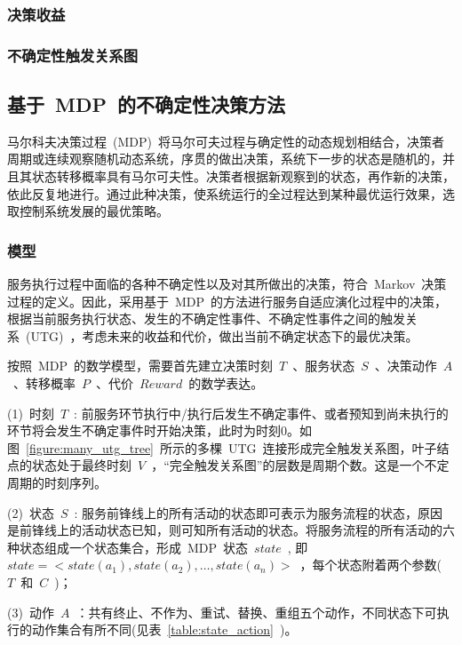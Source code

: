 


\subsubsection{决策收益}

\subsubsection{不确定性触发关系图}


\subsection{基于~MDP~的不确定性决策方法}
马尔科夫决策过程~(MDP)~将马尔可夫过程与确定性的动态规划相结合，决策者周期或连续观察随机动态系统，序贯的做出决策，系统下一步的状态是随机的，并且其状态转移概率具有马尔可夫性。决策者根据新观察到的状态，再作新的决策，依此反复地进行。通过此种决策，使系统运行的全过程达到某种最优运行效果，选取控制系统发展的最优策略。

\subsubsection{模型}

服务执行过程中面临的各种不确定性以及对其所做出的决策，符合~Markov~决策过程的定义。因此，采用基于~MDP~的方法进行服务自适应演化过程中的决策，根据当前服务执行状态、发生的不确定性事件、不确定性事件之间的触发关系~(UTG)~，考虑未来的收益和代价，做出当前不确定状态下的最优决策。

按照~MDP~的数学模型，需要首先建立决策时刻~$T$~、服务状态~$S$~、决策动作~$A$~、转移概率~$P$~、代价~$Reward$~的数学表达。

(1)~时刻~$T$~: 前服务环节执行中/执行后发生不确定事件、或者预知到尚未执行的环节将会发生不确定事件时开始决策，此时为时刻0。如图~\ref{figure:many_utg_tree}~所示的多棵~UTG~连接形成完全触发关系图，叶子结点的状态处于最终时刻~$V$~，“完全触发关系图”的层数是周期个数。这是一个不定周期的时刻序列。

(2)~状态~$S$~: 服务前锋线上的所有活动的状态即可表示为服务流程的状态，原因是前锋线上的活动状态已知，则可知所有活动的状态。将服务流程的所有活动的六种状态组成一个状态集合，形成~MDP~状态~$state$~, 即~$state =  < state({a_1}),state({a_2}), \ldots ,state({a_n}) >$~，每个状态附着两个参数(~$T$~和~$C$~)；

(3)~动作~$A$~：共有终止、不作为、重试、替换、重组五个动作，不同状态下可执行的动作集合有所不同(见表~\ref{table:state_action}~)。

